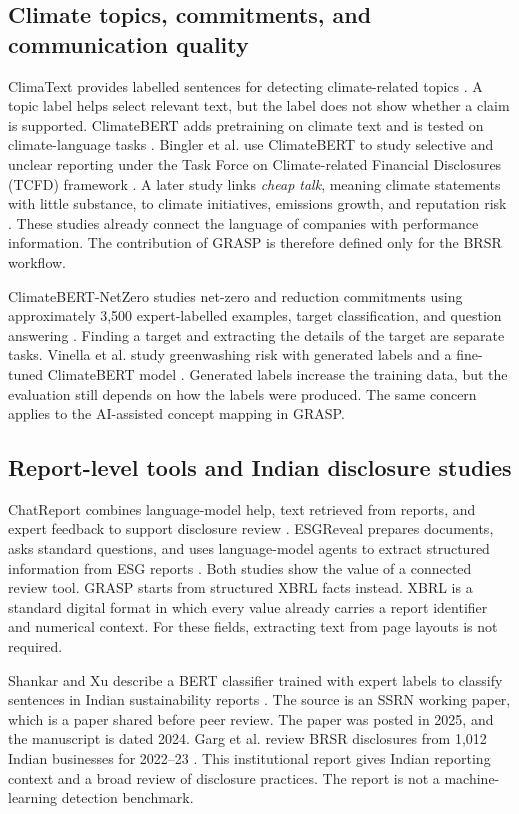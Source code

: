 \subsection{Climate topics, commitments, and communication quality}

ClimaText provides labelled sentences for detecting climate-related topics \cite{varini2020}. A topic label helps select relevant text, but the label does not show whether a claim is supported. ClimateBERT adds pretraining on climate text and is tested on climate-language tasks \cite{webersinke2021}. Bingler et al. use ClimateBERT to study selective and unclear reporting under the Task Force on Climate-related Financial Disclosures (TCFD) framework \cite{bingler2022}. A later study links \emph{cheap talk}, meaning climate statements with little substance, to climate initiatives, emissions growth, and reputation risk \cite{bingler2024}. These studies already connect the language of companies with performance information. The contribution of GRASP is therefore defined only for the BRSR workflow.

ClimateBERT-NetZero studies net-zero and reduction commitments using approximately 3,500 expert-labelled examples, target classification, and question answering \cite{schimanski2023}. Finding a target and extracting the details of the target are separate tasks. Vinella et al. study greenwashing risk with generated labels and a fine-tuned ClimateBERT model \cite{vinella2024}. Generated labels increase the training data, but the evaluation still depends on how the labels were produced. The same concern applies to the AI-assisted concept mapping in GRASP.

\subsection{Report-level tools and Indian disclosure studies}

ChatReport combines language-model help, text retrieved from reports, and expert feedback to support disclosure review \cite{ni2023}. ESGReveal prepares documents, asks standard questions, and uses language-model agents to extract structured information from ESG reports \cite{zou2025}. Both studies show the value of a connected review tool. GRASP starts from structured XBRL facts instead. XBRL is a standard digital format in which every value already carries a report identifier and numerical context. For these fields, extracting text from page layouts is not required.

Shankar and Xu describe a BERT classifier trained with expert labels to classify sentences in Indian sustainability reports \cite{shankar2025}. The source is an SSRN working paper, which is a paper shared before peer review. The paper was posted in 2025, and the manuscript is dated 2024. Garg et al. review BRSR disclosures from 1,012 Indian businesses for 2022--23 \cite{garg2025}. This institutional report gives Indian reporting context and a broad review of disclosure practices. The report is not a machine-learning detection benchmark.

